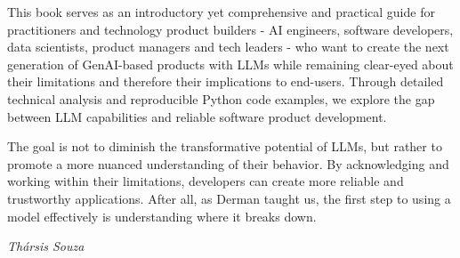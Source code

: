 This book serves as an introductory yet comprehensive and practical guide for practitioners and technology product builders - AI engineers, software developers, data scientists, product managers and tech leaders - who want to create the next generation of GenAI-based products with LLMs while remaining clear-eyed about their limitations and therefore their implications to end-users. Through detailed technical analysis and reproducible Python code examples, we explore the gap between LLM capabilities and reliable software product development.

The goal is not to diminish the transformative potential of LLMs, but rather to promote a more nuanced understanding of their behavior. By acknowledging and working within their limitations, developers can create more reliable and trustworthy applications. After all, as Derman taught us, the first step to using a model effectively is understanding where it breaks down.

\begin{flushright}
	\textit{Thársis Souza}
\end{flushright}